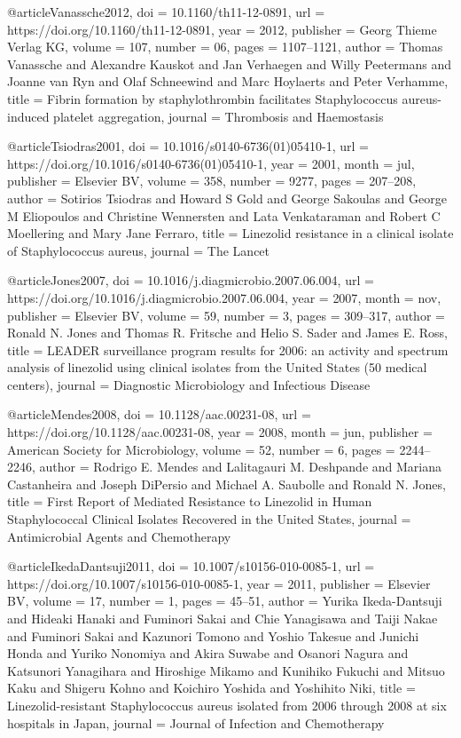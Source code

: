 @article{Vanassche2012,
  doi = {10.1160/th11-12-0891},
  url = {https://doi.org/10.1160/th11-12-0891},
  year = {2012},
  publisher = {Georg Thieme Verlag {KG}},
  volume = {107},
  number = {06},
  pages = {1107--1121},
  author = {Thomas Vanassche and Alexandre Kauskot and Jan Verhaegen and Willy Peetermans and Joanne van Ryn and Olaf Schneewind and Marc Hoylaerts and Peter Verhamme},
  title = {Fibrin formation by staphylothrombin facilitates Staphylococcus aureus-induced platelet aggregation},
  journal = {Thrombosis and Haemostasis}
}

@article{Tsiodras2001,
  doi = {10.1016/s0140-6736(01)05410-1},
  url = {https://doi.org/10.1016/s0140-6736(01)05410-1},
  year = {2001},
  month = jul,
  publisher = {Elsevier {BV}},
  volume = {358},
  number = {9277},
  pages = {207--208},
  author = {Sotirios Tsiodras and Howard S Gold and George Sakoulas and George M Eliopoulos and Christine Wennersten and Lata Venkataraman and Robert C Moellering and Mary Jane Ferraro},
  title = {Linezolid resistance in a clinical isolate of Staphylococcus aureus},
  journal = {The Lancet}
}

@article{Jones2007,
  doi = {10.1016/j.diagmicrobio.2007.06.004},
  url = {https://doi.org/10.1016/j.diagmicrobio.2007.06.004},
  year = {2007},
  month = nov,
  publisher = {Elsevier {BV}},
  volume = {59},
  number = {3},
  pages = {309--317},
  author = {Ronald N. Jones and Thomas R. Fritsche and Helio S. Sader and James E. Ross},
  title = {{LEADER} surveillance program results for 2006: an activity and spectrum analysis of linezolid using clinical isolates from the United States (50 medical centers)},
  journal = {Diagnostic Microbiology and Infectious Disease}
}

@article{Mendes2008,
  doi = {10.1128/aac.00231-08},
  url = {https://doi.org/10.1128/aac.00231-08},
  year = {2008},
  month = jun,
  publisher = {American Society for Microbiology},
  volume = {52},
  number = {6},
  pages = {2244--2246},
  author = {Rodrigo E. Mendes and Lalitagauri M. Deshpande and Mariana Castanheira and Joseph DiPersio and Michael A. Saubolle and Ronald N. Jones},
  title = {First Report of Mediated Resistance to Linezolid in Human Staphylococcal Clinical Isolates Recovered in the United States},
  journal = {Antimicrobial Agents and Chemotherapy}
}

@article{IkedaDantsuji2011,
  doi = {10.1007/s10156-010-0085-1},
  url = {https://doi.org/10.1007/s10156-010-0085-1},
  year = {2011},
  publisher = {Elsevier {BV}},
  volume = {17},
  number = {1},
  pages = {45--51},
  author = {Yurika Ikeda-Dantsuji and Hideaki Hanaki and Fuminori Sakai and Chie Yanagisawa and Taiji Nakae and Fuminori Sakai and Kazunori Tomono and Yoshio Takesue and Junichi Honda and Yuriko Nonomiya and Akira Suwabe and Osanori Nagura and Katsunori Yanagihara and Hiroshige Mikamo and Kunihiko Fukuchi and Mitsuo Kaku and Shigeru Kohno and Koichiro Yoshida and Yoshihito Niki},
  title = {Linezolid-resistant Staphylococcus aureus isolated from 2006 through 2008 at six hospitals in Japan},
  journal = {Journal of Infection and Chemotherapy}
}

